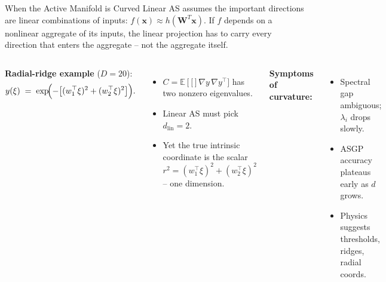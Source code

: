 \documentclass[aspectratio=169,11pt]{beamer}
\newcommand{\emphc}[1]{\textcolor{harvardcrimson}{#1}}
\newcommand{\x}{\bm{x}}
\newcommand{\W}{\bm{W}}
\newcommand{\R}{\mathbb{R}}
\newcommand{\E}[1]{\mathbb{E}\!\left[#1\right]}
\begin{document}
\begin{frame}{When the Active Manifold is Curved}
\scriptsize
Linear AS assumes the important directions are \emphc{linear} combinations of inputs: $f(\x) \approx h(\W^T \x)$.  If $f$ depends on a \emphc{nonlinear aggregate} of its inputs, the linear projection has to carry every direction that enters the aggregate -- not the aggregate itself.

\vspace{0.3em}
\begin{columns}[T]
\textbf{Radial-ridge example} ($D = 20$):
\[
 y(\xi) \;=\; \exp\!\Bigl(-\bigl[(w_1^\top\xi)^2 + (w_2^\top\xi)^2\bigr]\Bigr).
\]
\begin{itemize}\itemsep0pt
  \item $C = \E[\nabla y\, \nabla y^\top]$ has \emphc{two} nonzero eigenvalues.
  \item Linear AS must pick $d_{\mathrm{lin}} = 2$.
  \item Yet the true intrinsic coordinate is the \emphc{scalar} $r^2 = (w_1^\top\xi)^2 + (w_2^\top\xi)^2$ -- one dimension.
\end{itemize}

\vspace{0.2em}
\textbf{Symptoms of curvature:}
\begin{itemize}\itemsep0pt
  \item Spectral gap ambiguous; $\lambda_i$ drops slowly.
  \item ASGP accuracy plateaus early as $d$ grows.
  \item Physics suggests thresholds, ridges, radial coords.
\end{itemize}

\begin{center}
\end{center}


\end{columns}
\end{frame}
\end{document}
